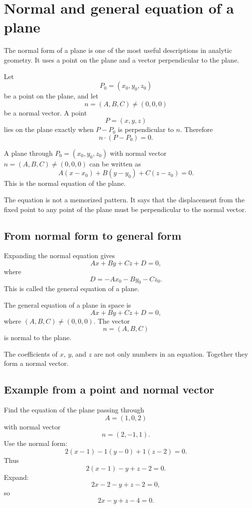 \section{Normal and general equation of a plane}

The normal form of a plane is one of the most useful descriptions in analytic geometry. It uses a point on the plane and a vector perpendicular to the plane.

Let
\[
P_0=(x_0,y_0,z_0)
\]
be a point on the plane, and let
\[
n=(A,B,C)\ne(0,0,0)
\]
be a normal vector. A point
\[
P=(x,y,z)
\]
lies on the plane exactly when \(P-P_0\) is perpendicular to \(n\). Therefore
\[
n\cdot(P-P_0)=0.
\]

\begin{definitionbox}
A plane through \(P_0=(x_0,y_0,z_0)\) with normal vector \(n=(A,B,C)\ne(0,0,0)\) can be written as
\[
A(x-x_0)+B(y-y_0)+C(z-z_0)=0.
\]
This is the normal equation of the plane.
\end{definitionbox}

The equation is not a memorized pattern. It says that the displacement from the fixed point to any point of the plane must be perpendicular to the normal vector.

\subsection*{From normal form to general form}

Expanding the normal equation gives
\[
Ax+By+Cz+D=0,
\]
where
\[
D=-Ax_0-By_0-Cz_0.
\]
This is called the general equation of a plane.

\begin{definitionbox}
The general equation of a plane in space is
\[
Ax+By+Cz+D=0,
\]
where \((A,B,C)\ne(0,0,0)\). The vector
\[
n=(A,B,C)
\]
is normal to the plane.
\end{definitionbox}

The coefficients of \(x\), \(y\), and \(z\) are not only numbers in an equation. Together they form a normal vector.

\subsection*{Example from a point and normal vector}

\begin{examplebox}
Find the equation of the plane passing through
\[
A=(1,0,2)
\]
with normal vector
\[
n=(2,-1,1).
\]
Use the normal form:
\[
2(x-1)-1(y-0)+1(z-2)=0.
\]
Thus
\[
2(x-1)-y+z-2=0.
\]
Expand:
\[
2x-2-y+z-2=0,
\]
so
\[
2x-y+z-4=0.
\]
\end{examplebox}

